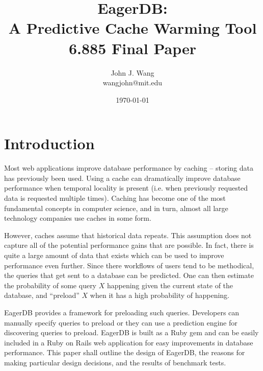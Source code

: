\documentclass[12pt]{article}
\title{EagerDB:\\
A Predictive Cache Warming Tool\\
6.885 Final Paper
}
\author{
John J. Wang\\
wangjohn@mit.edu\\
}
\date{\today}
\begin{document}
\maketitle


\section{Introduction}

Most web applications improve database performance by caching -- storing data has previously been used. Using a cache can dramatically improve database performance when temporal locality is present (i.e. when previously requested data is requested multiple times). Caching has become one of the most fundamental concepts in computer science, and in turn, almost all large technology companies use caches in some form.

However, caches assume that historical data repeats. This assumption does not capture all of the potential performance gains that are possible. In fact, there is quite a large amount of data that exists which can be used to improve performance even further. Since there workflows of users tend to be methodical, the queries that get sent to a database can be predicted. One can then estimate the probability of some query $X$ happening given the current state of the database, and ``preload'' $X$ when it has a high probability of happening.

EagerDB provides a framework for preloading such queries. Developers can manually specify queries to preload or they can use a prediction engine for discovering queries to preload. EagerDB is built as a Ruby gem and can be easily included in a Ruby on Rails web application for easy improvements in database performance. This paper shall outline the design of EagerDB, the reasons for making particular design decisions, and the results of benchmark tests.
\end{document}
